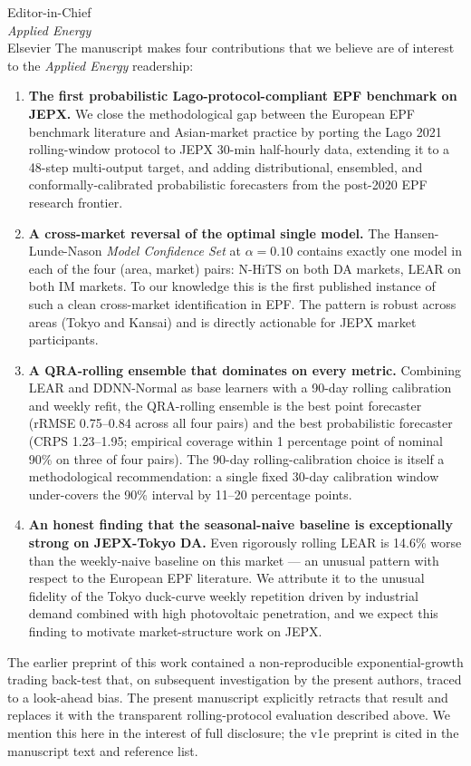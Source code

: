 \documentclass[11pt,a4paper]{letter}
\begin{document}
\begin{letter}{Editor-in-Chief \\ \emph{Applied Energy} \\ Elsevier}
The manuscript makes four contributions that we believe are of interest to the \emph{Applied Energy} readership:
\begin{enumerate}
\item \textbf{The first probabilistic Lago-protocol-compliant EPF benchmark on JEPX.} We close the methodological gap between the European EPF benchmark literature and Asian-market practice by porting the Lago 2021 rolling-window protocol to JEPX 30-min half-hourly data, extending it to a 48-step multi-output target, and adding distributional, ensembled, and conformally-calibrated probabilistic forecasters from the post-2020 EPF research frontier.
\item \textbf{A cross-market reversal of the optimal single model.} The Hansen-Lunde-Nason \emph{Model Confidence Set} at \(\alpha = 0.10\) contains exactly one model in each of the four (area, market) pairs: N-HiTS on both DA markets, LEAR on both IM markets. To our knowledge this is the first published instance of such a clean cross-market identification in EPF. The pattern is robust across areas (Tokyo and Kansai) and is directly actionable for JEPX market participants.
\item \textbf{A QRA-rolling ensemble that dominates on every metric.} Combining LEAR and DDNN-Normal as base learners with a 90-day rolling calibration and weekly refit, the QRA-rolling ensemble is the best point forecaster (rRMSE 0.75--0.84 across all four pairs) and the best probabilistic forecaster (CRPS 1.23--1.95; empirical coverage within 1 percentage point of nominal 90\% on three of four pairs). The 90-day rolling-calibration choice is itself a methodological recommendation: a single fixed 30-day calibration window under-covers the 90\% interval by 11--20 percentage points.
\item \textbf{An honest finding that the seasonal-naive baseline is exceptionally strong on JEPX-Tokyo DA.} Even rigorously rolling LEAR is 14.6\% worse than the weekly-naive baseline on this market --- an unusual pattern with respect to the European EPF literature. We attribute it to the unusual fidelity of the Tokyo duck-curve weekly repetition driven by industrial demand combined with high photovoltaic penetration, and we expect this finding to motivate market-structure work on JEPX.
\end{enumerate}

The earlier preprint of this work \citep*[on which the present manuscript is based but which it supersedes;][]{sriboriboon_v1e} contained a non-reproducible exponential-growth trading back-test that, on subsequent investigation by the present authors, traced to a look-ahead bias. The present manuscript explicitly retracts that result and replaces it with the transparent rolling-protocol evaluation described above. We mention this here in the interest of full disclosure; the v1e preprint is cited in the manuscript text and reference list.


\end{letter}
\end{document}
